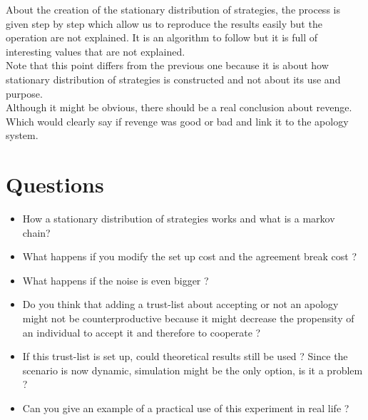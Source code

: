 \documentclass{article}
\begin{document}
About the creation of the stationary distribution of strategies, the process is given step by step which allow us to reproduce the results easily but the operation are not explained. It is an algorithm to follow but it is full of interesting values that are not explained.\\
Note that this point differs from the previous one because it is about how stationary distribution of strategies is constructed and not about its use and purpose.\\ 

Although it might be obvious, there should be a real conclusion about revenge. Which would clearly say if revenge was good or bad and link it to the apology system.



\section{Questions}
\begin{itemize}


\item How a stationary distribution of strategies works and what is a markov chain?

\item What happens if you modify the set up cost and the agreement break cost ?

\item What happens if the noise is even bigger ? 

\item Do you think that adding a trust-list about accepting or not an apology might not be counterproductive because it might decrease the propensity of an individual to accept it and therefore to cooperate ?

\item If this trust-list is set up, could theoretical results still be used ? Since the scenario is now dynamic, simulation might be the only option, is it a problem ?

\item Can you give an example of a practical use of this experiment in real life ? 

\end{itemize}
\end{document}
